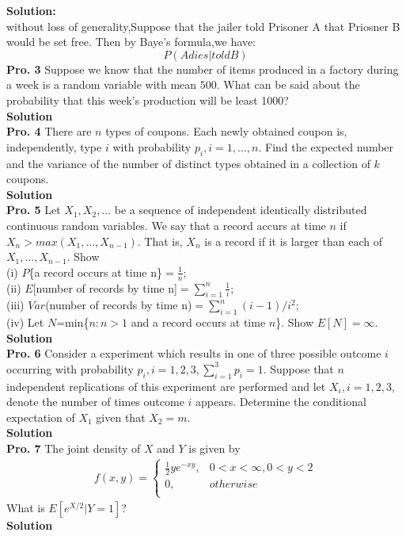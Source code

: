 \documentclass[12pt,onecolumn,journal]{IEEEtran}
\begin{document}
\textbf{Solution:}
\\
\textcolor[rgb]{1,0,0}
{
without loss of generality,Suppose that the jailer told Prisoner A that Priosner B would be set free.
Then by Baye's formula,we have:
\[

P(A dies|told B)
\]
}
\textbf{Pro. 3} Suppose we know that the number of items produced in a factory during a week is a random variable with mean $500$. What can be said about the probability that this week's production will be least 1000?
\\
\textbf{Solution}
\\

\textbf{Pro. 4} There are $n$ types of coupons. Each newly obtained coupon is, independently, type $i$ with probability $p_i, i=1,\ldots,n$. Find the expected number and the variance of the number of distinct types obtained in a collection of $k$ coupons.
\\
\textbf{Solution}
\\

\textbf{Pro. 5} Let $X_1, X_2, \ldots$ be a sequence of independent identically distributed continuous random variables. We say that a record accurs at time $n$ if $X_n>max(X_1,\ldots,X_{n-1})$. That is, $X_n$ is a record if it is larger than each of $X_1,\ldots,X_{n-1}$. Show\\
(i) $P$\{a record occurs at time n\}$=\frac{1}{n}$;\\
(ii) $E$[number of records by time n]$=\sum^n_{i=1}{\frac{1}{i}}$;\\
(iii) $Var$(number of records by time n)$=\sum^n_{i=1}{(i-1)/i^2}$;\\
(iv) Let $N$=min\{$n:n>1$ and a record occurs at time $n$\}. Show $E[N]=\infty$.
\\
\textbf{Solution}
\\

\textbf{Pro. 6} Consider a experiment which results in one of three possible outcome $i$ occurring with probability $p_i,i=1,2,3,\sum^3_{i=1}{p_i}=1$. Suppose that $n$ independent replications of this experiment are performed and let $X_i,i=1,2,3$, denote the number of times outcome $i$ appears. Determine the conditional expectation of $X_1$ given that $X_2=m$.
\\
\textbf{Solution}
\\


\textbf{Pro. 7} The joint density of $X$ and $Y$ is given by
\begin{eqnarray*}%
f(x,y)=
               \begin{cases}
                \frac{1}{2}ye^{-xy},    & 0<x<\infty,0<y<2 \\
                 0,  & otherwise\\
               \end{cases}
\end{eqnarray*}
What is $E[e^{X/2}|Y=1]$?
\\
\textbf{Solution}
\\
\end{document}
